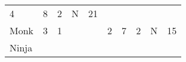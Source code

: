 \documentclass[12pt]{article}
\begin{document}
\begin{longtable}[]{@{}llllllllll@{}}
\begin{minipage}[t]{0.06\columnwidth}
4
\strut\end{minipage} &
\begin{minipage}[t]{0.06\columnwidth}\raggedright\strut
8
\strut\end{minipage} &
\begin{minipage}[t]{0.06\columnwidth}\raggedright\strut
2
\strut\end{minipage} &
\begin{minipage}[t]{0.07\columnwidth}\raggedright\strut
N
\strut\end{minipage} &
\begin{minipage}[t]{0.08\columnwidth}\raggedright\strut
21
\strut\end{minipage}\tabularnewline
\begin{minipage}[t]{0.13\columnwidth}\raggedright\strut
Monk
\strut\end{minipage} &
\begin{minipage}[t]{0.06\columnwidth}\raggedright\strut
3
\strut\end{minipage} &
\begin{minipage}[t]{0.06\columnwidth}\raggedright\strut
1
\strut\end{minipage} &
\begin{minipage}[t]{0.06\columnwidth}\raggedright\strut
\strut\end{minipage} &
\begin{minipage}[t]{0.06\columnwidth}\raggedright\strut
\strut\end{minipage} &
\begin{minipage}[t]{0.06\columnwidth}\raggedright\strut
2
\strut\end{minipage} &
\begin{minipage}[t]{0.06\columnwidth}\raggedright\strut
7
\strut\end{minipage} &
\begin{minipage}[t]{0.06\columnwidth}\raggedright\strut
2
\strut\end{minipage} &
\begin{minipage}[t]{0.07\columnwidth}\raggedright\strut
N
\strut\end{minipage} &
\begin{minipage}[t]{0.08\columnwidth}\raggedright\strut
15
\strut\end{minipage}\tabularnewline
\begin{minipage}[t]{0.13\columnwidth}\raggedright\strut
Ninja
\strut\end{minipage} &
\begin{minipage}[t]{0.06\columnwidth}\raggedright\strut

\end{minipage}
\end{longtable}
\end{document}
